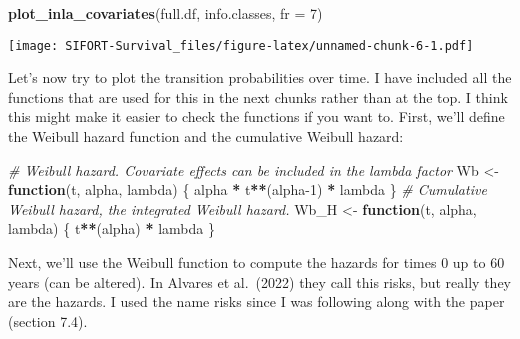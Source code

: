 \documentclass[
]{article}
\newenvironment{Shaded}{\begin{snugshade}}{\end{snugshade}}
\newcommand{\AttributeTok}[1]{\textcolor[rgb]{0.13,0.29,0.53}{#1}}
\newcommand{\CommentTok}[1]{\textcolor[rgb]{0.56,0.35,0.01}{\textit{#1}}}
\newcommand{\ControlFlowTok}[1]{\textcolor[rgb]{0.13,0.29,0.53}{\textbf{#1}}}
\newcommand{\DecValTok}[1]{\textcolor[rgb]{0.00,0.00,0.81}{#1}}
\newcommand{\FunctionTok}[1]{\textcolor[rgb]{0.13,0.29,0.53}{\textbf{#1}}}
\newcommand{\NormalTok}[1]{#1}
\newcommand{\OtherTok}[1]{\textcolor[rgb]{0.56,0.35,0.01}{#1}}
\newcommand{\SpecialCharTok}[1]{\textcolor[rgb]{0.81,0.36,0.00}{\textbf{#1}}}
\begin{document}
\begin{Shaded}
\begin{Highlighting}[]
\FunctionTok{plot\_inla\_covariates}\NormalTok{(full.df, info.classes, }\AttributeTok{fr =} \DecValTok{7}\NormalTok{)}
\end{Highlighting}
\end{Shaded}

\texttt{[image: SIFORT-Survival\_files/figure-latex/unnamed-chunk-6-1.pdf]}

Let's now try to plot the transition probabilities over time. I have
included all the functions that are used for this in the next chunks
rather than at the top. I think this might make it easier to check the
functions if you want to. First, we'll define the Weibull hazard
function and the cumulative Weibull hazard:

\begin{Shaded}
\begin{Highlighting}[]
\CommentTok{\# Weibull hazard. Covariate effects can be included in the lambda factor}
\NormalTok{Wb }\OtherTok{\textless{}{-}} \ControlFlowTok{function}\NormalTok{(t, alpha, lambda) \{}
\NormalTok{  alpha }\SpecialCharTok{*}\NormalTok{ t}\SpecialCharTok{**}\NormalTok{(alpha}\DecValTok{{-}1}\NormalTok{) }\SpecialCharTok{*}\NormalTok{ lambda}
\NormalTok{\}}
\CommentTok{\# Cumulative Weibull hazard, the integrated Weibull hazard.}
\NormalTok{Wb\_H }\OtherTok{\textless{}{-}} \ControlFlowTok{function}\NormalTok{(t, alpha, lambda) \{}
\NormalTok{  t}\SpecialCharTok{**}\NormalTok{(alpha) }\SpecialCharTok{*}\NormalTok{ lambda}
\NormalTok{\}}
\end{Highlighting}
\end{Shaded}

Next, we'll use the Weibull function to compute the hazards for times 0
up to 60 years (can be altered). In Alvares et al.~(2022) they call this
risks, but really they are the hazards. I used the name risks since I
was following along with the paper (section 7.4).
\end{document}
